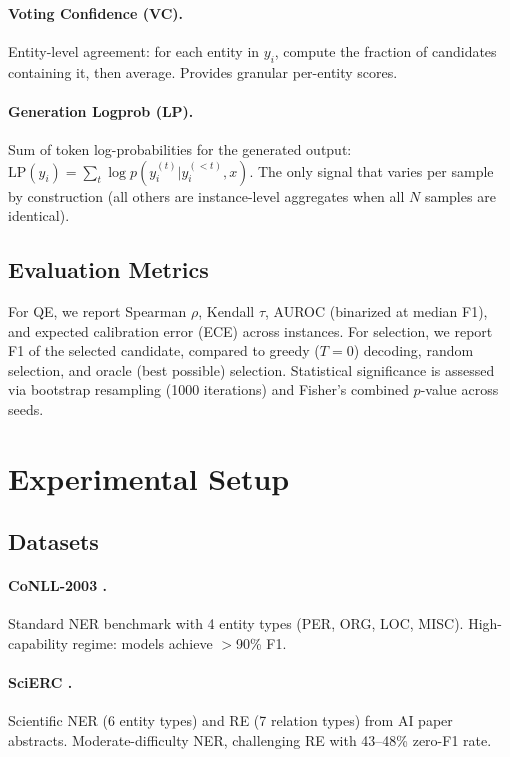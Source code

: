 \documentclass[11pt,twocolumn]{article}
\begin{document}
\paragraph{Voting Confidence (VC).}
Entity-level agreement: for each entity in $y_i$, compute the fraction of candidates containing it, then average.
Provides granular per-entity scores.

\paragraph{Generation Logprob (LP).}
Sum of token log-probabilities for the generated output: $\text{LP}(y_i) = \sum_{t} \log p(y_i^{(t)} | y_i^{(<t)}, x)$.
The only signal that varies per sample by construction (all others are instance-level aggregates when all $N$ samples are identical).

\subsection{Evaluation Metrics}

For QE, we report Spearman $\rho$, Kendall $\tau$, AUROC (binarized at median F1), and expected calibration error (ECE) across instances.
For selection, we report F1 of the selected candidate, compared to greedy ($T{=}0$) decoding, random selection, and oracle (best possible) selection.
Statistical significance is assessed via bootstrap resampling (1000 iterations) and Fisher's combined $p$-value across seeds.

\section{Experimental Setup}
\label{sec:setup}

\subsection{Datasets}

\paragraph{CoNLL-2003 \citep{sang2003conll}.} Standard NER benchmark with 4 entity types (PER, ORG, LOC, MISC).
High-capability regime: models achieve $>$90\% F1.

\paragraph{SciERC \citep{luan2018scierc}.} Scientific NER (6 entity types) and RE (7 relation types) from AI paper abstracts.
Moderate-difficulty NER, challenging RE with 43--48\% zero-F1 rate.
\end{document}
